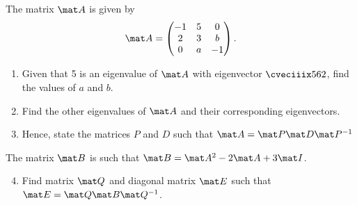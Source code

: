 \begin{problem}
    The matrix $\mat A$ is given by \[\mat A = \begin{pmatrix}-1 & 5 & 0 \\ 2 & 3 & b \\ 0 & a & -1\end{pmatrix}.\]

    \begin{enumerate}
        \item Given that 5 is an eigenvalue of $\mat A$ with eigenvector $\cveciiix562$, find the values of $a$ and $b$.
        \item Find the other eigenvalues of $\mat A$ and their corresponding eigenvectors.
        \item Hence, state the matrices $P$ and $D$ such that $\mat A = \mat P \mat D \mat P^{-1}$
    \end{enumerate}

    The matrix $\mat B$ is such that $\mat B = \mat A^2 - 2 \mat A + 3 \mat I$.

    \begin{enumerate}
        \setcounter{enumi}{3}
        \item Find matrix $\mat Q$ and diagonal matrix $\mat E$ such that $\mat E = \mat Q \mat B \mat Q^{-1}$.
    \end{enumerate}
\end{problem}

